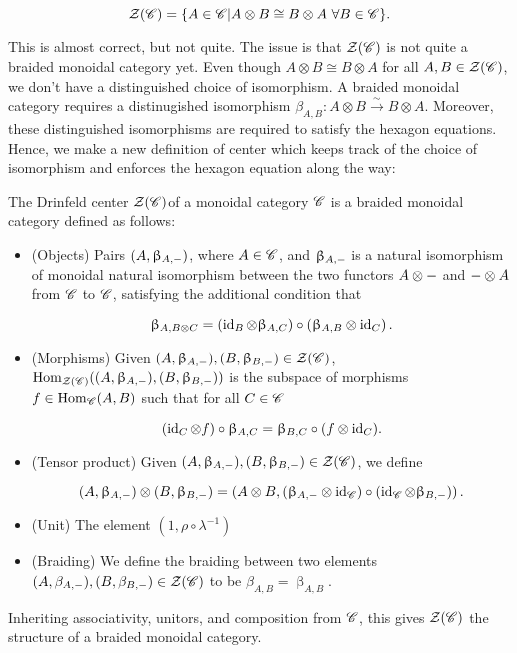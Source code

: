 $$\mathcal{Z}(\mathscr{C})=\{A\in \mathscr{C} | A\otimes B \cong B\otimes A \,\, \forall B\in \mathscr{C}\}.$$

This is almost correct, but not quite. The issue is that $\mathcal{Z}(\mathscr{C})$ is not quite a braided monoidal category yet. Even though $A\otimes B\cong B\otimes A$ for all $A,B\in \mathcal{Z}(\mathscr{C})$, we don't have a distinguished choice of isomorphism. A braided monoidal category requires a distinugished isomorphism $\beta_{A,B}:A\otimes B\xrightarrow{\sim} B\otimes A$. Moreover, these distinguished isomorphisms are required to satisfy the hexagon equations. Hence, we make a new definition of center which keeps track of the choice of isomorphism and enforces the hexagon equation along the way:


\begin{proposition} The Drinfeld center $\mathcal{Z}(\mathscr{C})$of a monoidal category $\mathscr{C}$ is a braided monoidal category defined as follows:

\begin{itemize}
\item (Objects) Pairs $(A,\upbeta_{A,\--})$, where $A\in \mathscr{C}$, and $\upbeta_{A,\--}$ is a natural isomorphism of monoidal natural isomorphism between the two functors $A\otimes \--$ and $\--\otimes A$ from $\mathscr{C}$ to $\mathscr{C}$, satisfying the additional condition that

$$\upbeta_{A,B\otimes C}=\left(\operatorname{id}_{B}\otimes \upbeta_{A,C}\right)\circ \left(\upbeta_{A,B}\otimes \operatorname{id}_C\right).$$

\item (Morphisms) Given $(A,\upbeta_{A,\--}), (B,\upbeta_{B,\--})\in \mathcal{Z}(\mathscr{C})$, $\operatorname{Hom}_{\mathcal{Z}(\mathscr{C})}((A,\upbeta_{A,\--}),(B,\upbeta_{B,\--}))$ is the subspace of morphisms $f\in \operatorname{Hom}_{\mathscr{C}}(A,B)$ such that for all $C\in \mathscr{C}$

$$\left(\operatorname{id}_{C}\otimes f\right)\circ \upbeta_{A,C}=\upbeta_{B,C}\circ (f\otimes \operatorname{id}_C).$$

\item (Tensor product) Given $(A,\upbeta_{A,\--}), (B,\upbeta_{B,\--})\in \mathcal{Z}(\mathscr{C})$, we define

$$(A,\upbeta_{A,\--})\otimes (B,\upbeta_{B,\--})=\left(A\otimes B, (\upbeta_{A,\--}\otimes \operatorname{id}_{\mathscr{C}})\circ (\operatorname{id}_{\mathscr{C}}\otimes \upbeta_{B,\--}) \right).$$

\item (Unit) The element $(1,\rho\circ \lambda^{-1})$

\item (Braiding) We define the braiding between two elements $(A,\beta_{A,\--}), (B,\beta_{B,\--})\in \mathcal{Z}(\mathscr{C})$ to be $\beta_{A,B}=\upbeta_{A,B}$.
\end{itemize}

Inheriting associativity, unitors, and composition from $\mathscr{C}$, this gives $\mathcal{Z}(\mathscr{C})$ the structure of a braided monoidal category.
\end{proposition}
